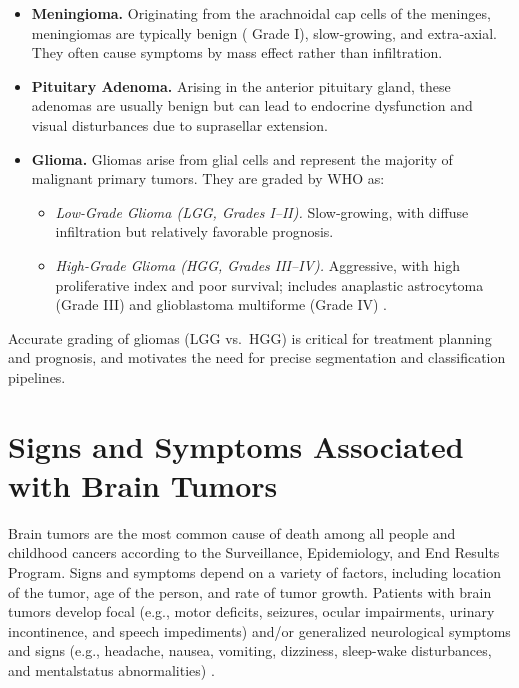 \begin{itemize}
  \item \textbf{Meningioma.}
        Originating from the arachnoidal cap cells of the meninges, meningiomas are typically benign ( Grade I), slow‐growing, and extra‐axial. They often cause symptoms by mass effect rather than infiltration.

  \item \textbf{Pituitary Adenoma.}
        Arising in the anterior pituitary gland, these adenomas are usually benign but can lead to endocrine dysfunction and visual disturbances due to suprasellar extension.

  \item \textbf{Glioma.}
        Gliomas arise from glial cells and represent the majority of malignant primary  tumors. They are graded by WHO as:
        \begin{itemize}
          \item \emph{Low-Grade Glioma (LGG, Grades I–II).} Slow‐growing, with diffuse infiltration but relatively favorable prognosis.
          \item \emph{High-Grade Glioma (HGG, Grades III–IV).} Aggressive, with high proliferative index and poor survival; includes anaplastic astrocytoma (Grade III) and glioblastoma multiforme (Grade IV) \cite{naser2020lgmi}.
        \end{itemize}
\end{itemize}

Accurate grading of gliomas (LGG vs.\ HGG) is critical for treatment planning and prognosis, and motivates the need for precise segmentation and classification pipelines.


\section{Signs and Symptoms Associated with Brain Tumors}
Brain tumors are the most common cause of death among all people and childhood cancers according to the Surveillance, Epidemiology,
and End Results Program. Signs and symptoms depend on a variety
of factors, including location of the tumor, age of the person, and rate
of tumor growth. Patients with brain tumors develop focal (e.g., motor
deficits, seizures, ocular impairments, urinary incontinence, and speech
impediments) and/or generalized neurological symptoms and signs (e.g.,
headache, nausea, vomiting, dizziness, sleep-wake disturbances, and mentalstatus abnormalities) \cite{ref9}.

